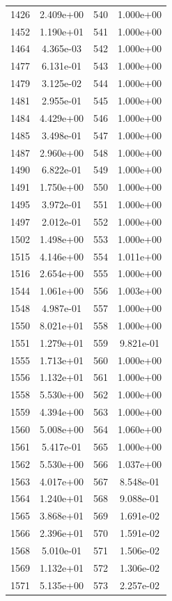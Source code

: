 \documentclass[12pt]{article}
\begin{document}
\begin{longtable}{@{}cccc@{}}
1426 & 2.409e+00 & 540 & 1.000e+00 \\
1452 & 1.190e+01 & 541 & 1.000e+00 \\
1464 & 4.365e-03 & 542 & 1.000e+00 \\
1477 & 6.131e-01 & 543 & 1.000e+00 \\
1479 & 3.125e-02 & 544 & 1.000e+00 \\
1481 & 2.955e-01 & 545 & 1.000e+00 \\
1484 & 4.429e+00 & 546 & 1.000e+00 \\
1485 & 3.498e-01 & 547 & 1.000e+00 \\
1487 & 2.960e+00 & 548 & 1.000e+00 \\
1490 & 6.822e-01 & 549 & 1.000e+00 \\
1491 & 1.750e+00 & 550 & 1.000e+00 \\
1495 & 3.972e-01 & 551 & 1.000e+00 \\
1497 & 2.012e-01 & 552 & 1.000e+00 \\
1502 & 1.498e+00 & 553 & 1.000e+00 \\
1515 & 4.146e+00 & 554 & 1.011e+00 \\
1516 & 2.654e+00 & 555 & 1.000e+00 \\
1544 & 1.061e+00 & 556 & 1.003e+00 \\
1548 & 4.987e-01 & 557 & 1.000e+00 \\
1550 & 8.021e+01 & 558 & 1.000e+00 \\
1551 & 1.279e+01 & 559 & 9.821e-01 \\
1555 & 1.713e+01 & 560 & 1.000e+00 \\
1556 & 1.132e+01 & 561 & 1.000e+00 \\
1558 & 5.530e+00 & 562 & 1.000e+00 \\
1559 & 4.394e+00 & 563 & 1.000e+00 \\
1560 & 5.008e+00 & 564 & 1.060e+00 \\
1561 & 5.417e-01 & 565 & 1.000e+00 \\
1562 & 5.530e+00 & 566 & 1.037e+00 \\
1563 & 4.017e+00 & 567 & 8.548e-01 \\
1564 & 1.240e+01 & 568 & 9.088e-01 \\
1565 & 3.868e+01 & 569 & 1.691e-02 \\
1566 & 2.396e+01 & 570 & 1.591e-02 \\
1568 & 5.010e-01 & 571 & 1.506e-02 \\
1569 & 1.132e+01 & 572 & 1.306e-02 \\
1571 & 5.135e+00 & 573 & 2.257e-02 \\

\end{longtable}
\end{document}
